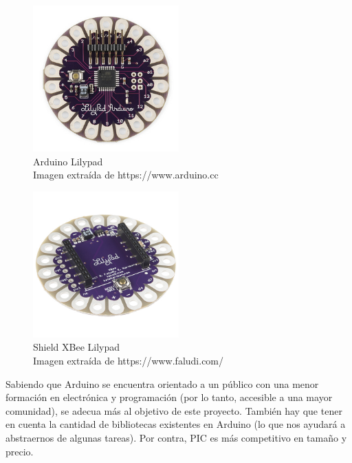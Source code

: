 \begin{description}
\begin{figure}[!htb]
    \centering
    \captionsetup{justification=centering}
    \includegraphics[width=0.5\textwidth]{./imagenes/lilypad}
    \caption{Arduino Lilypad\\
     \scriptsize{Imagen extraída de https://www.arduino.cc}} \label{fig:lilypad}
    \end{figure}

    \begin{figure}[htb]
    \centering
    \captionsetup{justification=centering}
    \includegraphics[width=0.5\textwidth]{./imagenes/lilypadxbee}
    \caption{Shield XBee Lilypad\\
      \scriptsize{Imagen extraída de https://www.faludi.com/ \cite{faludi}}} \label{fig:lilypadxbee}
    \end{figure}
\end{description}


\clearpage

Sabiendo que Arduino se encuentra orientado a un público con una menor formación en electrónica y
programación (por lo tanto, accesible a una mayor comunidad), se adecua más al objetivo de este proyecto.
También hay que tener en cuenta la cantidad de bibliotecas
existentes en Arduino (lo que nos ayudará a abstraernos de algunas tareas). Por contra,
PIC es más competitivo en tamaño y precio.\\

